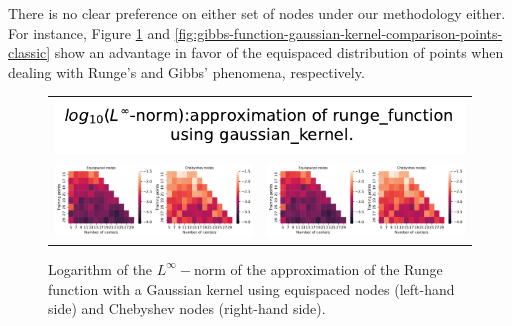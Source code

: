 \documentclass[12pt]{report} %
\begin{document}
There is no clear preference on either set of nodes under our methodology either. For instance, Figure \ref{fig:runge-function-gaussian-kernel-comparison-points-classic} and \ref{fig:gibbs-function-gaussian-kernel-comparison-points-classic} show an advantage in favor of the equispaced distribution of points when dealing with Runge's and Gibbs' phenomena, respectively.

\begin{figure}[h]
  \begin{tabular}{cc}
    \multicolumn{2}{c}{{\includegraphics[width=.5\textwidth]
    {imagenes/experiments/1d/variational/linf_runge_function_gaussian_kernel_Points_Title.pdf}}}                                                                                       \\
    {\includegraphics[height=.4\textwidth, trim={0 0 11.5cm 0},clip=true]
    {imagenes/experiments/1d/variational/linf_runge_function_gaussian_kernel_Points_Comparison.pdf}}  &
     {\includegraphics[height=.4\textwidth, trim={9.5cm 0 0 0},clip=true]{imagenes/experiments/1d/variational/linf_runge_function_gaussian_kernel_Points_Comparison.pdf}} \\
  \end{tabular}
  \caption{Logarithm of the $L^\infty-$norm of the approximation of the Runge function with a Gaussian kernel using equispaced nodes (left-hand side) and Chebyshev nodes (right-hand side).}
  \label{fig:runge-function-gaussian-kernel-comparison-points-classic}
\end{figure}
\end{document}
